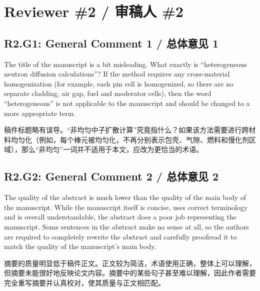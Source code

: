 \documentclass[11pt,a4paper,twoside]{article}
\begin{document}
\section{Reviewer \#2 / 审稿人 \#2}
\subsection{R2.G1: General Comment 1 / 总体意见 1}
\begin{englishcomment}
The title of the manuscript is a bit misleading. What exactly is ``heterogeneous neutron diffusion calculations''? If the method requires any cross-material homogenization (for example, each pin cell is homogenized, so there are no separate cladding, air gap, fuel and moderator cells), then the word ``heterogeneous'' is not applicable to the manuscript and should be changed to a more appropriate term.
\end{englishcomment}
\begin{chinesecomment}
稿件标题略有误导。“非均匀中子扩散计算”究竟指什么？如果该方法需要进行跨材料均匀化（例如，每个棒元被均匀化，不再分别表示包壳、气隙、燃料和慢化剂区域），那么“非均匀”一词并不适用于本文，应改为更恰当的术语。
\end{chinesecomment}
\begin{revisionidea}
\end{revisionidea}

\subsection{R2.G2: General Comment 2 / 总体意见 2}
\begin{englishcomment}
The quality of the abstract is much lower than the quality of the main body of the manuscript. While the manuscript itself is concise, uses correct terminology and is overall understandable, the abstract does a poor job representing the manuscript. Some sentences in the abstract make no sense at all, so the authors are required to completely rewrite the abstract and carefully proofread it to match the quality of the manuscript's main body.
\end{englishcomment}
\begin{chinesecomment}
摘要的质量明显低于稿件正文。正文较为简洁，术语使用正确，整体上可以理解，但摘要未能很好地反映论文内容。摘要中的某些句子甚至难以理解，因此作者需要完全重写摘要并认真校对，使其质量与正文相匹配。
\end{chinesecomment}
\begin{revisionidea}
\end{revisionidea}
\end{document}
